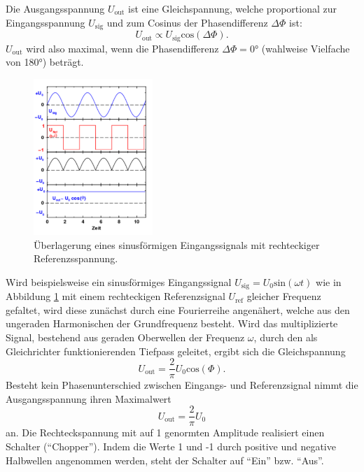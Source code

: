 Die Ausgangsspannung $U_\mathup{out}$ ist eine Gleichspannung, welche proportional zur Eingangsspannung $U_\mathup{sig}$ und zum Cosinus der Phasendifferenz $\Delta\Phi$ ist:
\begin{equation}
 	U_\mathup{out}\propto{U_\text{sig}}\text{cos}(\Delta\Phi). 
 	\label{cosinus_ausgangsspannung}
 \end{equation} 
$U_\mathup{out}$ wird also maximal, wenn die Phasendifferenz $\Delta\Phi=0°$ (wahlweise Vielfache von 180°) beträgt. \cite{regensburg}

\begin{figure}
	\centering
		\includegraphics[width=0.4\textwidth]{Bilder/Beispiel.pdf}
		\caption{Überlagerung eines sinusförmigen Eingangssignals mit rechteckiger Referenzsspannung. \cite{V303}}
		\label{fig:bsp}
	\end{figure}
Wird beispielsweise ein sinusförmiges Eingangssignal $U_\mathup{sig}=U_0\text{sin}(\omega t)$ wie in Abbildung \ref{fig:bsp} mit einem rechteckigen Referenzsignal $U_\mathup{ref}$ gleicher Frequenz gefaltet, wird diese zunächst durch eine Fourierreihe angenähert, welche aus den ungeraden Harmonischen der Grundfrequenz besteht. 
Wird das multiplizierte Signal,  bestehend aus geraden Oberwellen der Frequenz $\omega$, durch den als Gleichrichter funktionierenden Tiefpass geleitet, ergibt sich die Gleichspannung
\begin{equation}
	U_\mathup{out}=\frac{2}{\pi}U_0\text{cos}(\Phi).
\end{equation}
Besteht kein Phasenunterschied zwischen Eingangs- und Referenzsignal nimmt die Ausgangsspannung ihren Maximalwert 
\begin{equation}
	U_\mathup{out}=\frac{2}{\pi}U_0
\end{equation}
an.
Die Rechteckspannung mit auf 1 genormten Amplitude realisiert einen Schalter (\enquote{Chopper}). 
Indem die Werte 1 und -1 durch positive und negative Halbwellen angenommen werden, steht der Schalter auf \enquote{Ein} bzw. \enquote{Aus}.



